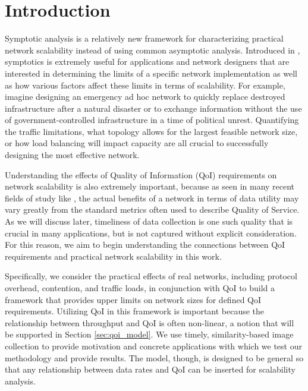 
\section{Introduction}
\label{sec:intro}

Symptotic analysis is a relatively new framework for characterizing practical network scalability instead of using common asymptotic analysis.  Introduced in \cite{scalability_manets_theory_vs_practice}, symptotics is extremely useful for applications and network designers that are interested in determining the limits of a specific network implementation as well as how various factors affect these limits in terms of scalability.  For example, imagine designing an emergency ad hoc network to quickly replace destroyed infrastructure after a natural disaster or to exchange information without the use of government-controlled infrastructure in a time of political unrest.  Quantifying the traffic limitations, what topology allows for the largest feasible network size, or how load balancing will impact capacity are all crucial to successfully designing the most effective network.

Understanding the effects of Quality of Information (QoI) requirements on network scalability is also extremely important, because as seen in many recent fields of study like \cite{qoi_aware_tactical_mil_nets, qoi_max_two_hop_nets, opt_qoi_data_collection_bijarbooneh, qoi_aware_mobile_apps, explor_vs_exploit, qoi_sched_task_proc_nets}, the actual benefits of a network in terms of data utility may vary greatly from the standard metrics often used to describe Quality of Service.  As we will discuss later, timeliness of data collection is one such quality that is crucial in many applications, but is not captured without explicit consideration.  %
For this reason, we aim to begin understanding the connections between QoI requirements and practical network scalability in this work.

Specifically, we consider the practical effects of real networks, including protocol overhead, contention, and traffic loads, in conjunction with QoI to build a framework that provides upper limits on network sizes for defined QoI requirements.  Utilizing QoI in this framework is important because the relationship between throughput and QoI is often non-linear, a notion that will be supported in Section \ref{sec:qoi_model}.  We use timely, similarity-based image collection to provide motivation and concrete applications with which we test our methodology and provide results.  The model, though, is designed to be general so that any relationship between data rates and QoI can be inserted for scalability analysis.

